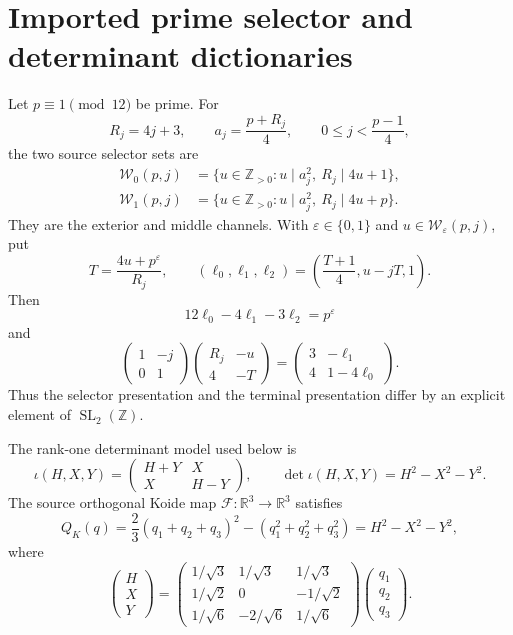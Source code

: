 \documentclass[11pt]{article}
\theoremstyle{definition}
\theoremstyle{remark}
\newcommand{\Z}{\mathbb Z}
\newcommand{\R}{\mathbb R}
\newcommand{\SL}{\operatorname{SL}}
\newcommand{\eps}{\varepsilon}
\newcommand{\1}{\mathbf 1}
\newcommand{\mat}[4]{\begin{pmatrix}#1&#2\\#3&#4\end{pmatrix}}
\begin{document}
\section{Imported prime selector and determinant dictionaries}

Let $p\equiv1\pmod{12}$ be prime.  For
\begin{equation}\label{eq:R-a-prime}
 R_j=4j+3,\qquad a_j=\frac{p+R_j}{4},
 \qquad 0\le j<\frac{p-1}{4},
\end{equation}
the two source selector sets are
\begin{align}
 \mathcal W_0(p,j)
 &=\{u\in\Z_{>0}:u\mid a_j^2,\ R_j\mid4u+1\},\label{eq:E-source}\\
 \mathcal W_1(p,j)
 &=\{u\in\Z_{>0}:u\mid a_j^2,\ R_j\mid4u+p\}.\label{eq:M-source}
\end{align}
They are the exterior and middle channels.  With $\eps\in\{0,1\}$ and
$u\in\mathcal W_\eps(p,j)$, put
\begin{equation}\label{eq:source-T}
 T=\frac{4u+p^\eps}{R_j},\qquad
 (\ell_0,\ell_1,\ell_2)
 =\left(\frac{T+1}{4},u-jT,1\right).
\end{equation}
Then
\begin{equation}\label{eq:source-lambda}
 12\ell_0-4\ell_1-3\ell_2=p^\eps
\end{equation}
and
\begin{equation}\label{eq:source-shear}
 \mat{1}{-j}{0}{1}
 \mat{R_j}{-u}{4}{-T}
 =
 \mat{3}{-\ell_1}{4}{1-4\ell_0}.
\end{equation}
Thus the selector presentation and the terminal presentation differ by an
explicit element of $\SL_2(\Z)$.

The rank-one determinant model used below is
\begin{equation}\label{eq:iota}
 \iota(H,X,Y)=\mat{H+Y}{X}{X}{H-Y},\qquad
 \det\iota(H,X,Y)=H^2-X^2-Y^2.
\end{equation}
The source orthogonal Koide map $\mathcal F:\R^3\to\R^3$ satisfies
\begin{equation}\label{eq:koide-orthogonal}
 Q_K(q)=\frac23(q_1+q_2+q_3)^2-(q_1^2+q_2^2+q_3^2)
 =H^2-X^2-Y^2,
\end{equation}
where
\begin{equation}\label{eq:F}
 \begin{pmatrix}H\\X\\Y\end{pmatrix}
 =
 \begin{pmatrix}
 1/\sqrt3&1/\sqrt3&1/\sqrt3\\
 1/\sqrt2&0&-1/\sqrt2\\
 1/\sqrt6&-2/\sqrt6&1/\sqrt6
 \end{pmatrix}
 \begin{pmatrix}q_1\\q_2\\q_3\end{pmatrix}.
\end{equation}
\end{document}
